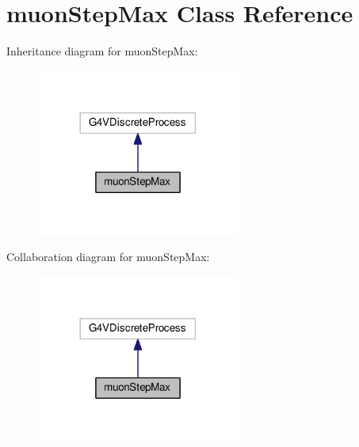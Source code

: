 \hypertarget{classmuonStepMax}{}\section{muon\+Step\+Max Class Reference}
\label{classmuonStepMax}


Inheritance diagram for muon\+Step\+Max\+:\nopagebreak
\begin{figure}[H]
\begin{center}
\leavevmode
\includegraphics[width=189pt]{classmuonStepMax__inherit__graph}
\end{center}
\end{figure}


Collaboration diagram for muon\+Step\+Max\+:\nopagebreak
\begin{figure}[H]
\begin{center}
\leavevmode
\includegraphics[width=189pt]{classmuonStepMax__coll__graph}
\end{center}
\end{figure}
